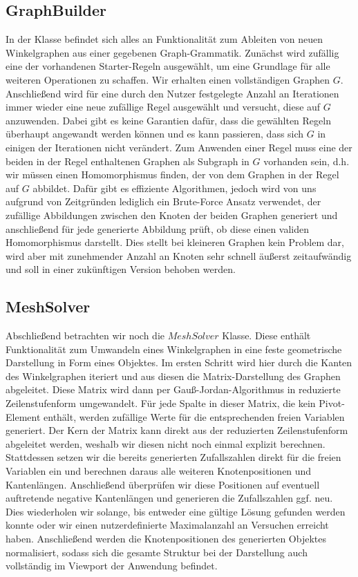 \subsection{GraphBuilder}
In der  Klasse befindet sich alles an Funktionalität zum Ableiten von neuen Winkelgraphen aus einer gegebenen
Graph-Grammatik. Zunächst wird zufällig eine der vorhandenen Starter-Regeln ausgewählt, um eine Grundlage für alle weiteren Operationen
zu schaffen. Wir erhalten einen vollständigen Graphen \(G\). Anschließend wird für eine durch den Nutzer festgelegte Anzahl an
Iterationen immer wieder eine neue zufällige Regel ausgewählt und versucht, diese auf \(G\) anzuwenden. Dabei gibt es keine Garantien
dafür, dass die gewählten Regeln überhaupt angewandt werden können und es kann passieren, dass sich \(G\) in einigen der Iterationen
nicht verändert. Zum Anwenden einer Regel muss eine der beiden in der Regel enthaltenen Graphen als Subgraph in \(G\) vorhanden sein,
d.h. wir müssen einen Homomorphismus finden, der von dem Graphen in der Regel auf \(G\) abbildet. Dafür gibt es effiziente Algorithmen,
jedoch wird von uns aufgrund von Zeitgründen lediglich ein Brute-Force Ansatz verwendet, der zufällige Abbildungen zwischen den Knoten
der beiden Graphen generiert und anschließend für jede generierte Abbildung prüft, ob diese einen validen Homomorphismus darstellt.
Dies stellt bei kleineren Graphen kein Problem dar, wird aber mit zunehmender Anzahl an Knoten sehr schnell äußerst zeitaufwändig und
soll in einer zukünftigen Version behoben werden.

\subsection{MeshSolver}
Abschließend betrachten wir noch die \(MeshSolver\) Klasse. Diese enthält Funktionalität zum Umwandeln eines Winkelgraphen in eine
feste geometrische Darstellung in Form eines  Objektes. Im ersten Schritt wird hier durch die Kanten des
Winkelgraphen iteriert und aus diesen die Matrix-Darstellung des Graphen abgeleitet. Diese Matrix wird dann per Gauß-Jordan-Algorithmus
in reduzierte Zeilenstufenform umgewandelt. Für jede Spalte in dieser Matrix, die kein Pivot-Element enthält, werden zufällige
Werte für die entsprechenden freien Variablen generiert. Der Kern der Matrix kann direkt aus der reduzierten Zeilenstufenform
abgeleitet werden, weshalb wir diesen nicht noch einmal explizit berechnen. Stattdessen setzen wir die bereits generierten Zufallszahlen
direkt für die freien Variablen ein und berechnen daraus alle weiteren Knotenpositionen und Kantenlängen. Anschließend überprüfen wir
diese Positionen auf eventuell auftretende negative Kantenlängen und generieren die Zufallszahlen ggf. neu. Dies wiederholen wir solange,
bis entweder eine gültige Lösung gefunden werden konnte oder wir einen nutzerdefinierte Maximalanzahl an Versuchen erreicht haben.
Anschließend werden die Knotenpositionen des generierten  Objektes normalisiert, sodass sich die gesamte Struktur
bei der Darstellung auch vollständig im Viewport der Anwendung befindet.

